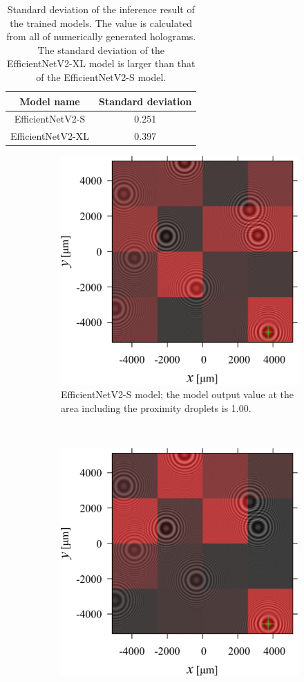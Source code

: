 \begin{table}[H]
    \centering
    \caption{Standard deviation of the inference result of the trained models. The value is calculated from all of numerically generated holograms. The standard deviation of the EfficientNetV2-XL model is larger than that of the EfficientNetV2-S model.}
    \begin{tabular}{cc}
        Model name & Standard deviation \\ \hline \hline
        EfficientNetV2-S & 0.251 \\ \hline
        EfficientNetV2-XL & 0.397 \\
    \end{tabular}
    \label{table:stddev}
\end{table}

\begin{figure}[H]
    \centering
    \begin{subfigure}[t]{0.85\linewidth}
        \centering
        \includegraphics[width=0.7\linewidth]{./Figure/4_Results/training/outholoS.pdf}
        \caption{EfficientNetV2-S model; the model output value at the area including the proximity droplets is \num{1.00}. }
        \label{fig:numericalInfResult:s}
    \end{subfigure}
    \\
    \begin{subfigure}[t]{0.85\linewidth}
        \centering
        \includegraphics[width=0.7\linewidth]{./Figure/4_Results/training/outholoXL.pdf}

\end{subfigure}
\end{figure}
